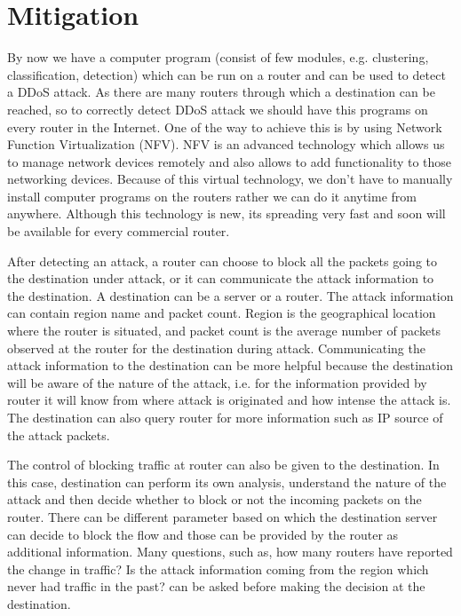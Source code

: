 \documentclass[12pt,oneside,a4paper]{article}
\begin{document}
\section{Mitigation}

By now we have a computer program (consist of few modules, e.g. clustering, classification, detection) which can be run on a router and can be used to detect a DDoS attack. As there are many routers through which a destination can be reached, so to correctly detect DDoS attack we should have this programs on every router in the Internet. One of the way to achieve this is by using Network Function Virtualization (NFV)\cite{nfv}. NFV is an advanced technology which allows us to manage network devices remotely and also allows to add functionality to those networking devices. Because of this virtual technology, we don't have to manually install computer programs on the routers rather we can do it anytime from anywhere. Although this technology is new, its spreading very fast and soon will be available for every commercial router.

After detecting an attack, a router can choose to block all the packets going to the destination under attack, or it can communicate the attack information to the destination. A destination can be a server or a router. The attack information can contain region name and packet count. Region is the geographical location where the router is situated, and packet count is the average number of packets observed at the router for the destination during attack. Communicating the attack information to the destination can be more helpful because the destination will be aware of the nature of the attack, i.e. for the information provided by router it will know from where attack is originated and how intense the attack is. The destination can also query router for more information such as IP source of the attack packets.

The control of blocking traffic at router can also be given to the destination. In this case, destination can perform its own analysis, understand the nature of the attack and then decide whether to block or not the incoming packets on the router. There can be different parameter based on which the destination server can decide to block the flow and those can be provided by the router as additional information. Many questions, such as, how many routers have reported the change in traffic? Is the attack information coming from the region which never had traffic in the past? can be asked before making the decision at the destination.
\end{document}
